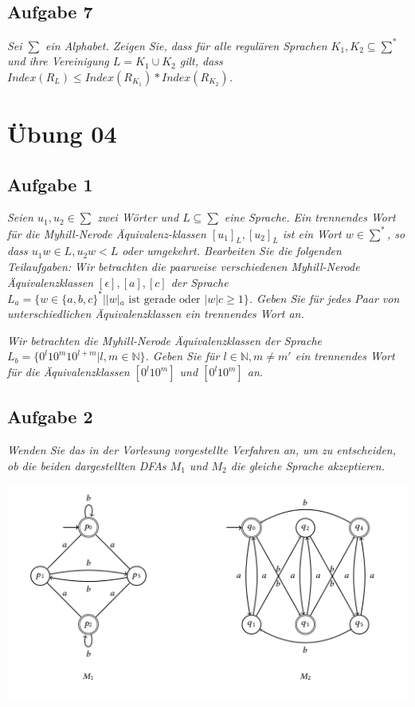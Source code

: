 \documentclass[a4paper]{article}
\begin{document}
\subsection{Aufgabe 7}
\textit{Sei $\sum$ ein Alphabet. Zeigen Sie, dass für alle regulären Sprachen $K_1,K_2\subseteq\sum^*$ und ihre Vereinigung $L=K_1\cup K_2$ gilt, dass $Index(R_L)\leq Index(R_{K_1})* Index(R_{K_2})$.}

\newpage
\section{Übung 04}
\subsection{Aufgabe 1}
\textit{Seien $u_1, u_2\in\sum$ zwei Wörter und $L\subseteq\sum$ eine Sprache. Ein trennendes Wort für die Myhill-Nerode Äquivalenz-klassen  $[u_1]_L, [u_2]_L$ ist ein Wort $w\in\sum^*$, so dass $u_1 w\in L, u_2w < L$ oder umgekehrt. Bearbeiten Sie die folgenden Teilaufgaben:}
\textit{Wir betrachten die paarweise verschiedenen Myhill-Nerode Äquivalenzklassen $[\epsilon], [a], [c]$ der Sprache $L_a = \{w\in \{a, b, c\}^* | |w|_a \text{ ist gerade oder } |w| c \geq 1\}$. Geben Sie für jedes Paar von unterschiedlichen Äquivalenzklassen ein trennendes Wort an.}

\textit{Wir betrachten die Myhill-Nerode Äquivalenzklassen der Sprache $L_b = \{0^l 10^m 10^{l +m} | l, m \in\mathbb{N}\}$. Geben Sie für $l\in\mathbb{N}, m\not= m'$ ein trennendes Wort für die Äquivalenzklassen $[0^l 10^m ]$ und $[0^l 10^m]$ an.}


\subsection{Aufgabe 2}
\textit{Wenden Sie das in der Vorlesung vorgestellte Verfahren an, um zu entscheiden, ob die beiden dargestellten DFAs $M_1$ und $M_2$ die gleiche Sprache akzeptieren.}

\includegraphics{Assets/ASK_uebung/u04_01.png}
\end{document}
